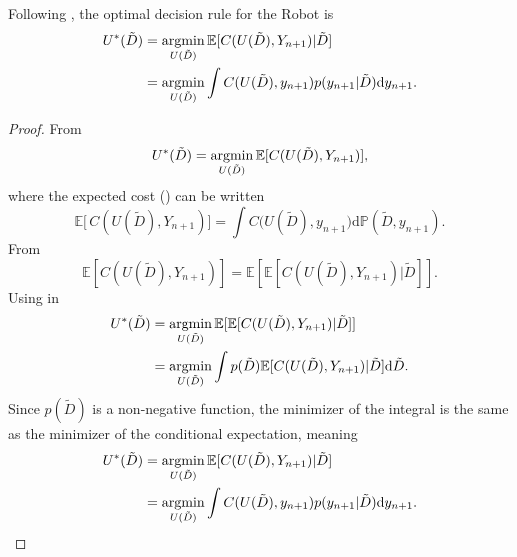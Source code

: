 \begin{theorem}
	\label{theorem:opt_decision_rule}
	Following , the optimal decision rule for the Robot is
	\begin{equation}
		\begin{split}
			U^*(\tilde{D}) &= \operatorname*{argmin}_{U(\tilde{D})} \mathbb{E}[C(U(\tilde{D}), Y_{n+1})|\tilde{D}]\\
			& = \operatorname*{argmin}_{U(\tilde{D})}\int  C(U(\tilde{D}),y_{n+1}) p(y_{n+1}|\tilde{D}) \mathrm{d}y_{n+1}.
		\end{split}
		\label{eq:decision_rule3}
	\end{equation}
	
\end{theorem}
\begin{proof}
	From 
	\begin{equation}
		U^*(\tilde{D}) = \operatorname*{argmin}_{U(\tilde{D})} \mathbb{E}[C(U(\tilde{D}), Y_{n+1})],
		\label{eq:decision_rule_x}
	\end{equation}	
	where the expected cost () can be written
	\begin{equation}
			\mathbb{E}\big[\,C(U(\tilde{D}) ,Y_{n+1})\big]= \int C\big(U(\tilde{D}),y_{n+1}\big) \mathrm{d}\mathbb{P}(\tilde{D},y_{n+1}).
		\label{eq:conditional_expected_cost}
	\end{equation}
	From 
	\begin{equation}
		\mathbb{E}[C(U(\tilde{D}) , Y_{n+1})] = \mathbb{E}[\mathbb{E}[C(U(\tilde{D}) , Y_{n+1})|\tilde{D}]].
		\label{eq:total2}
	\end{equation}
	Using  in 
	\begin{equation}
		\begin{split}
			U^*(\tilde{D}) &= \operatorname*{argmin}_{U(\tilde{D}) } \mathbb{E}[\mathbb{E}[C(U(\tilde{D}) , Y_{n+1})|\tilde{D}]]\\
			&= \operatorname*{argmin}_{U(\tilde{D})} \int p(\tilde{D}) \mathbb{E}[C(U(\tilde{D}), Y_{n+1})|\tilde{D}] \mathrm{d}\tilde{D}.
		\end{split}
		\label{eq:decision_rule2}
	\end{equation}
	Since $p(\tilde{D})$ is a non-negative function, the minimizer of the integral is the same as the minimizer of the conditional expectation, meaning
	\begin{equation}
		\begin{split}
			U^*(\tilde{D}) &= \operatorname*{argmin}_{U(\tilde{D})} \mathbb{E}[C(U(\tilde{D}), Y_{n+1})|\tilde{D}]\\
			& = \operatorname*{argmin}_{U(\tilde{D})}\int  C(U(\tilde{D}),y_{n+1}) p(y_{n+1}|\tilde{D}) \mathrm{d}y_{n+1}.
		\end{split}
	\end{equation}
\end{proof}

